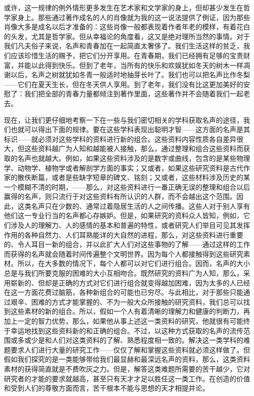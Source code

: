 \documentclass[12pt,oneside]{book}
\begin{document}
或许，这一规律的例外情形更多发生在艺术家和文学家的身上，但却甚少发生在哲学家身上。那些通过著作成名的人的肖像就为我的这一说法提供了例证，因为那些肖像大多是成名以后才准备的：这些肖像一般都表现着作者年老的模样，有着花白的头发，尤其是哲学家。但从幸福论的角度看，这又是绝对理所当然的事情。对于我们凡夫俗子来说，名声和青春加在一起简直太奢侈了。我们生活这样的贫乏，我们应该珍惜生活的赐予，把它们分开享用。在青春期，我们已经拥有足够的宝贵财富，并能以此得到快乐。但到了老年，当所有的快乐和欢娱犹如冬天的树木一样凋谢以后，名声之树就犹如冬青一般适时地抽芽长叶了。我们也可以把名声比作冬梨——它们在夏天生长，但在冬天供人享用。到了老年，我们没有比这更加美好的安慰了：我们把全部的青春力量都倾注到著作里面，这些著作并不会随着我们一起老去。 

现在，让我们更仔细地考察一下在一些与我们密切相关的学科获取名声的途径，我们也就可以得出下面的规律。要在这些学科表现出聪明才智——这方面的名声是其标识——就必须对这些学科的资料进行新的组合。这些资料内容性质各自差异很大，但这些资料越广为人知和越能被人接触，那么，通过整理和组合这些资料而获取的名声也就越大。例如，如果这些资料涉及的是数字或曲线，包含的是某些物理学、动物学、植物学或者解剖学方面的事实；又或者，如果这些研究资料是古代作家的散佚断篇，或者是些缺字短章的碑文、铭刻；又或者，这些材料涉及历史的某一个模糊不清的时期，——那么，对这些资料进行一番正确无误的整理和组合以后赢得的名声，则只流行于对这些资料有所认识的人群，而不会越出这个范围。因此，这类名声只在少数的、通常过着隐居生活的人之间传播。这些人对于别人享有他们这一专业行当的名声都心存嫉妒。但是，如果研究的资料众人皆知，例如，它们涉及人的理解力、人的感情的基本和普遍的特性，或者研究人们举目可见其发挥作用的各种自然力、人们耳熟能详的大自然的进程，那么，对这些资料进行重要的、令人耳目一新的组合，并以此扩大人们对这些事物的了解——通过这样的工作而获得的名声就会随着时间传遍整个文明世界。因为每个人都接触得到这些研究素材。所以，在大多数的情况下，每个人都可以对它们进行组合。因而，名声的大小总是与我们所要克服的困难的大小互相吻合。既然研究的资料广为人知，那么，采用崭新的、但却是正确的方式对它们进行组合就变得越加困难，因为太多的人已经在这一方面花费过脑筋，各种新组合的可能也已穷尽。与此相比，对于那些只能通过艰辛、困难的方式才能掌握的、不为一般大众所接触的研究资料，我们总可以找到这些素材的新的组合。所以，假如一个人有着清晰的理解力和健康的判断力，再加上一定的智力优势，那么，如果他从事上述这一类资料的研究，他就很有可能终于幸运地找到这些资料新的和正确的组合。不过，以这种方式获取的名声的流传范围或多或少是和人们对这类资料的了解、熟悉程度相一致的。解决这一类学科的难题要求人们进行大量的研究工作——仅仅了解和掌握这些资料就必须这样做了。但假如我们探究的是一类能够带给我们最显赫和最深远名声的资料，那么，这类资料素材的获得简直就是不费吹灰之力。但是，解答这类难题所需要的苦干越少，它对研究者的才能的要求就越高，甚至只有天才才足以胜任这一类工作。在创造的价值和受到人们的尊敬方面而言，苦干根本不能与思想的天才相提并论。 
\end{document}

